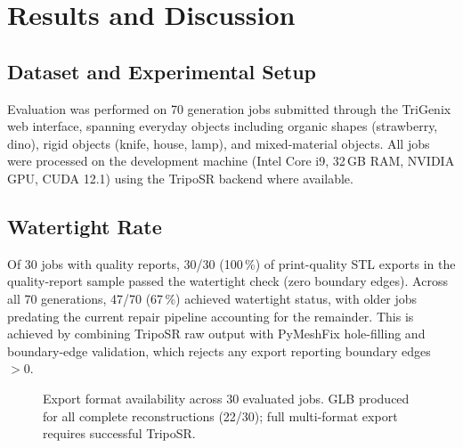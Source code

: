﻿\documentclass[conference]{IEEEtran}
\begin{document}
\section{Results and Discussion}

\subsection{Dataset and Experimental Setup}

Evaluation was performed on 70 generation jobs submitted through the TriGenix web interface, spanning everyday
objects including organic shapes (strawberry, dino), rigid objects (knife, house, lamp), and mixed-material objects.
All jobs were processed on the development machine (Intel Core i9, 32\,GB RAM, NVIDIA GPU, CUDA 12.1) using the
TripoSR backend where available.

\subsection{Watertight Rate}

Of 30 jobs with quality reports, 30/30 (100\,\%) of print-quality STL exports in the quality-report sample passed the watertight check (zero boundary edges). Across all 70 generations, 47/70 (67\,\%) achieved watertight status, with older jobs predating the current repair pipeline accounting for the remainder. This is achieved by combining TripoSR raw output with PyMeshFix hole-filling and
boundary-edge validation, which rejects any export reporting boundary edges $> 0$.

\begin{figure}[htbp]
\centering
{}
\caption{Export format availability across 30 evaluated jobs. GLB produced for all complete reconstructions (22/30); full multi-format export requires successful TripoSR.}
\label{fig:exports}
\end{figure}
\end{document}
